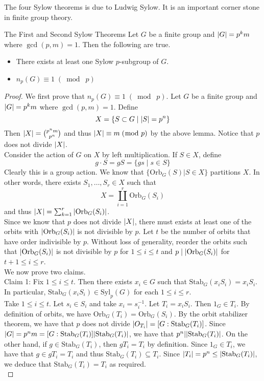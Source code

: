 \documentclass[a4paper]{article}
\begin{document}
The four Sylow theorems is due to Ludwig Sylow. It is an important corner stone in finite group theory. 

\begin{thm}{The First and Second Sylow Theorems}{} Let $G$ be a finite group and $\abs{G}=p^km$ where $\gcd(p,m)=1$. Then the following are true. 
\begin{itemize}
\item There exists at least one Sylow $p$-subgroup of $G$. 
\item $n_p(G)\equiv1\;(\bmod\;p)$
\end{itemize} 
\begin{proof}
We first prove that $n_p(G)\equiv 1\;(\bmod\;p)$. Let $G$ be a finite group and $\abs{G}=p^km$ where $\gcd(p,m)=1$. Define $$X=\{S\subset G\;|\;\abs{S}=p^n\}$$ Then $\abs{X}=\binom{p^nm}{p^n}$ and thus $\abs{X}\equiv m\;(\bmod\;p)$ by the above lemma. Notice that $p$ does not divide $\abs{X}$. \\

Consider the action of $G$ on $X$ by left multiplication. If $S\in X$, define $$g\cdot S=gS=\{gs\;|\;s\in S\}$$ Clearly this is a group action. We know that $\{\text{Orb}_G(S)|S\in X\}$ partitions $X$. In other words, there exists $S_1,\dots,S_r\in X$ such that $$X=\coprod_{i=1}^r\text{Orb}_G(S_i)$$ and thus $\abs{X}=\sum_{k=1}^r\abs{\text{Orb}_G(S_i)}$. \\
Since we know that $p$ does not divide $\abs{X}$, there must exists at least one of the orbits with $\abs{\text{Orb}_G(S_i)}$ is not divisible by $p$. Let $t$ be the number of orbits that have order indivisible by $p$. Without loss of generality, reorder the orbits such that $\abs{\text{Orb}_G(S_i)}$ is not divisible by $p$ for $1\leq i\leq t$ and $p\;|\;\abs{\text{Orb}_G(S_i)}$ for $t+1\leq i\leq r$. \\

We now prove two claims. \\
Claim 1: Fix $1\leq i\leq t$. Then there exists $x_i\in G$ such that $\text{Stab}_G(x_iS_i)=x_iS_i$. In particular, $\text{Stab}_G(x_iS_i)\in\text{Syl}_p(G)$ for each $1\leq i\leq r$. \\
Take $1\leq i\leq t$. Let $s_i\in S_i$ and take $x_i=s_i^{-1}$. Let $T_i=x_iS_i$. Then $1_G\in T_i$. By definition of orbits, we have $\text{Orb}_G(T_i)=\text{Orb}_G(S_i)$. By the orbit stabilizer theorem, we have that $p$ does not divide $\abs{O_{T_i}}=[G:\text{Stab}_G(T_i)]$. Since $\abs{G}=p^nm=[G:\text{Stab}_G(T_i)]\abs{\text{Stab}_G(T_i)}$, we have that $p^n|\abs{\text{Stab}_G(T_i)}$. On the other hand, if $g\in\text{Stab}_G(T_i)$, then $gT_i=T_i$ by definition. Since $1_G\in T_i$, we have that $g\in gT_i=T_i$ and thus $\text{Stab}_G(T_i)\subseteq T_i$. Since $\abs{T_i}=p^n\leq\abs{\text{Stab}_G(T_i)}$, we deduce that $\text{Stab}_G(T_i)=T_i$ as required. \\


\end{proof}
\end{thm}
\end{document}
